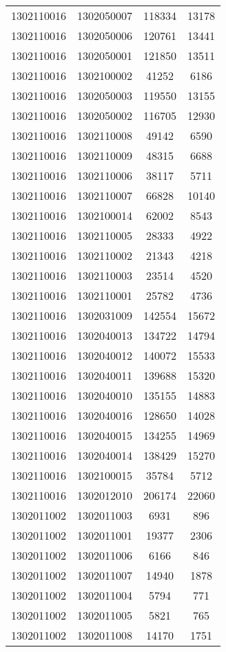 \begin{longtable}{llcc}
1302110016 & 1302050007 & 118334 & 13178\\
1302110016 & 1302050006 & 120761 & 13441\\
1302110016 & 1302050001 & 121850 & 13511\\
1302110016 & 1302100002 & 41252 & 6186\\
1302110016 & 1302050003 & 119550 & 13155\\
1302110016 & 1302050002 & 116705 & 12930\\
1302110016 & 1302110008 & 49142 & 6590\\
1302110016 & 1302110009 & 48315 & 6688\\
1302110016 & 1302110006 & 38117 & 5711\\
1302110016 & 1302110007 & 66828 & 10140\\
1302110016 & 1302100014 & 62002 & 8543\\
1302110016 & 1302110005 & 28333 & 4922\\
1302110016 & 1302110002 & 21343 & 4218\\
1302110016 & 1302110003 & 23514 & 4520\\
1302110016 & 1302110001 & 25782 & 4736\\
1302110016 & 1302031009 & 142554 & 15672\\
1302110016 & 1302040013 & 134722 & 14794\\
1302110016 & 1302040012 & 140072 & 15533\\
1302110016 & 1302040011 & 139688 & 15320\\
1302110016 & 1302040010 & 135155 & 14883\\
1302110016 & 1302040016 & 128650 & 14028\\
1302110016 & 1302040015 & 134255 & 14969\\
1302110016 & 1302040014 & 138429 & 15270\\
1302110016 & 1302100015 & 35784 & 5712\\
1302110016 & 1302012010 & 206174 & 22060\\
1302011002 & 1302011003 & 6931 & 896\\
1302011002 & 1302011001 & 19377 & 2306\\
1302011002 & 1302011006 & 6166 & 846\\
1302011002 & 1302011007 & 14940 & 1878\\
1302011002 & 1302011004 & 5794 & 771\\
1302011002 & 1302011005 & 5821 & 765\\
1302011002 & 1302011008 & 14170 & 1751\\

\end{longtable}

